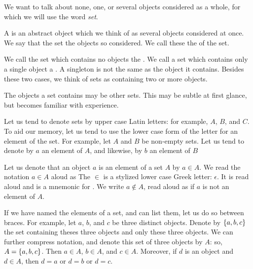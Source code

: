 
\sbasic



\sstart



We want to talk
about none, one, or
several objects considered
as a whole,
for which we will use
the word \textit{set}.


A  is an abstract
object which we think of as
several objects considered
at once.
We say that the set
the objects so considered.
We call these
the
 of the set.

We call the set which contains
no objects the
.
We call
a set which contains
only a single object a
.
A singleton is not the
same as the object
it contains.
Besides these two cases,
we think of sets
as containing
two or more objects.

The objects a set contains
may be other sets.
This may be subtle at
first glance, but becomes
familiar with experience.


Let us tend to
denote sets by
upper case Latin letters:
for example,
$A$, $B$, and $C$.
To aid our memory,
let us tend to use the lower
case form of the letter for
an element of the set.
For example,
let $A$ and $B$ be
non-empty sets.
Let us tend to denote by
$a$ an element of $A$,
and likewise,
by $b$ an element of $B$

Let us denote that
an object $a$
is an element of a set $A$
by $a \in A$.
We read the notation
$a \in A$ aloud as 
The $\in$ is a stylized
lower case Greek letter: $\epsilon$.
It is
read aloud  and
is a mnemonic for .
We write $a \not\in A$, read aloud
as  if $a$ is not
an element of $A$.

If we have named
the elements of a set,
and can list them,
let us do so between braces.
For example,
let $a$, $b$, and $c$
be three distinct objects.
Denote by $\{a, b, c\}$
the set containing theses
three objects and only these
three objects.
We can further compress notation,
and denote this set of
three objects by $A$:
so, $A = \{a, b, c\}$.
Then $a \in A$,
$b \in A$, and $c \in A$.
Moreover, if $d$
is an object and
$d \in A$, then $d = a$
or $d = b$ or $d = c$.


